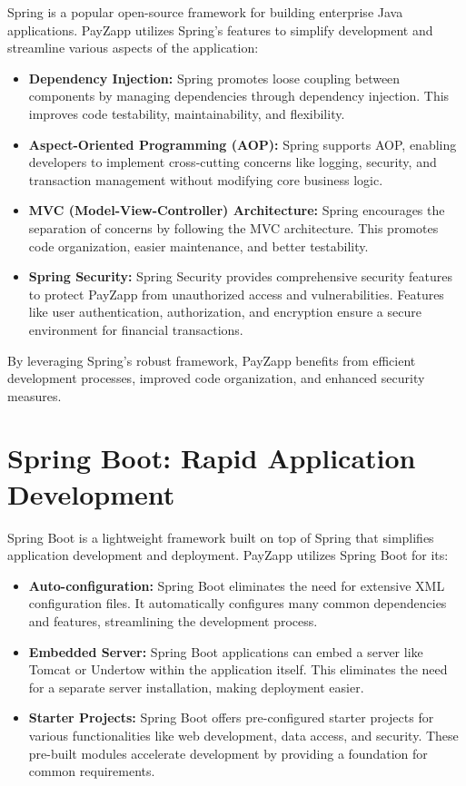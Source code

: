 \documentclass[12pt,a4paper]{report}
\begin{document}
Spring is a popular open-source framework for building enterprise Java applications. PayZapp utilizes Spring's features to simplify development and streamline various aspects of the application:

\begin{itemize}
    \item \textbf{Dependency Injection:} Spring promotes loose coupling between components by managing dependencies through dependency injection. This improves code testability, maintainability, and flexibility.
    
    \item \textbf{Aspect-Oriented Programming (AOP):} Spring supports AOP, enabling developers to implement cross-cutting concerns like logging, security, and transaction management without modifying core business logic.
    
    \item \textbf{MVC (Model-View-Controller) Architecture:} Spring encourages the separation of concerns by following the MVC architecture. This promotes code organization, easier maintenance, and better testability.
    
    \item \textbf{Spring Security:} Spring Security provides comprehensive security features to protect PayZapp from unauthorized access and vulnerabilities. Features like user authentication, authorization, and encryption ensure a secure environment for financial transactions.
\end{itemize}

By leveraging Spring's robust framework, PayZapp benefits from efficient development processes, improved code organization, and enhanced security measures.

\section{Spring Boot: Rapid Application Development}

Spring Boot is a lightweight framework built on top of Spring that simplifies application development and deployment. PayZapp utilizes Spring Boot for its:

\begin{itemize}
    \item \textbf{Auto-configuration:} Spring Boot eliminates the need for extensive XML configuration files. It automatically configures many common dependencies and features, streamlining the development process.
    
    \item \textbf{Embedded Server:} Spring Boot applications can embed a server like Tomcat or Undertow within the application itself. This eliminates the need for a separate server installation, making deployment easier.
    
    \item \textbf{Starter Projects:} Spring Boot offers pre-configured starter projects for various functionalities like web development, data access, and security. These pre-built modules accelerate development by providing a foundation for common requirements.
\end{itemize}
\end{document}
